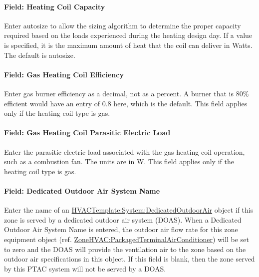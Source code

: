 \paragraph{Field: Heating Coil Capacity}\label{field-heating-coil-capacity}

Enter autosize to allow the sizing algorithm to determine the proper capacity required based on the loads experienced during the heating design day. If a value is specified, it is the maximum amount of heat that the coil can deliver in Watts. The default is autosize.

\paragraph{Field: Gas Heating Coil Efficiency}\label{field-gas-heating-coil-efficiency}

Enter gas burner efficiency as a decimal, not as a percent. A burner that is 80\% efficient would have an entry of 0.8 here, which is the default. This field applies only if the heating coil type is gas.

\paragraph{Field: Gas Heating Coil Parasitic Electric Load}\label{field-gas-heating-coil-parasitic-electric-load}

Enter the parasitic electric load associated with the gas heating coil operation, such as a combustion fan. The units are in W. This field applies only if the heating coil type is gas.

\paragraph{Field: Dedicated Outdoor Air System Name}\label{field-dedicated-outdoor-air-system-name-2}

Enter the name of an \hyperref[hvactemplatesystemdedicatedoutdoorair]{HVACTemplate:System:DedicatedOutdoorAir} object if this zone is served by a dedicated outdoor air system (DOAS). When a Dedicated Outdoor Air System Name is entered, the outdoor air flow rate for this zone equipment object (ref. \hyperref[zonehvacpackagedterminalairconditioner]{ZoneHVAC:PackagedTerminalAirConditioner}) will be set to zero and the DOAS will provide the ventilation air to the zone based on the outdoor air specifications in this object. If this field is blank, then the zone served by this PTAC system will not be served by a DOAS.

